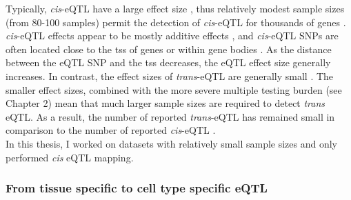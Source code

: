 Typically, \textit{cis}-eQTL have a large effect size \cite{sherman2009systematic}, thus relatively modest sample sizes (from 80-100 samples) permit the detection of \textit{cis}-eQTL for thousands of genes \cite{stranger2007population, myers2007survey}
. 
\textit{cis}-eQTL effects appear to be mostly additive effects \cite{powell2013congruence}, and \textit{cis}-eQTL SNPs are often located close to the \gls{tss} of genes or within gene bodies 
\cite{vosa2018unraveling}. 
As the distance between the eQTL SNP and the \gls{tss} decreases, the eQTL effect size generally increases.
In contrast, the effect sizes of \textit{trans}-eQTL are generally small \cite{cookson2009mapping, grundberg2012mapping}. 
The smaller effect sizes, combined with the more severe multiple testing burden (see Chapter 2) mean that much larger sample sizes are required to detect \textit{trans} eQTL.
As a result, the number of reported \textit{trans}-eQTL has remained small
\cite{grundberg2012mapping}
in comparison to the number of reported \textit{cis}-eQTL \cite{westra2014genome}.\\

In this thesis, I worked on datasets with relatively small sample sizes and only performed \textit{cis} eQTL mapping.

\subsubsection{From tissue specific to cell type specific eQTL}

